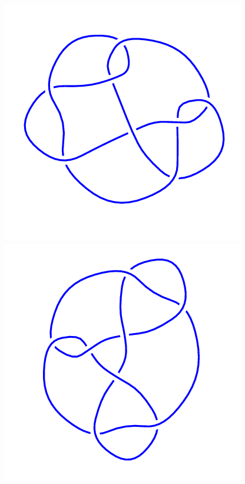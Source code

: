 \begin{figure}[H]
\begin{minipage}[b]{.18\linewidth}
    \end{minipage}
    \begin{minipage}[b]{.18\linewidth}
        \centering
        \includegraphics[width=\linewidth]{../data/8_14.png}
    \end{minipage}
    \begin{minipage}[b]{.18\linewidth}
        \centering
        \includegraphics[width=\linewidth]{../data/8_15.png}

\end{minipage}
\end{figure}
